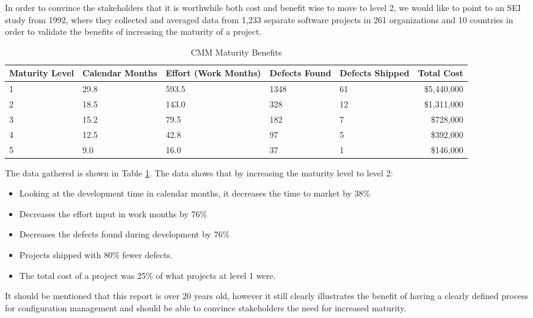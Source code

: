 \documentclass[10pt]{article}
\begin{document}
\noindent In order to convince the stakeholders that it is worthwhile both cost and benefit wise to move to level 2, we would like to point to an SEI study \cite{Merant} from 1992, where they collected and averaged data from 1,233 separate software projects in 261 organizations and 10 countries in order to validate the benefits of increasing the maturity of a project.
\\

\begin{table}[h!]
    \centering
        \begin{tabular}{| p{2cm} | p{2cm} | p{2cm} | l | l | r |}
         \hline
        Maturity Level & Calendar Months & Effort (Work Months) & Defects Found & Defects Shipped & Total Cost \\ \hline
        1 & 29.8 & 593.5 & 1348 & 61 & \$5,440,000 \\ \hline
        2 & 18.5 & 143.0 & 328 & 12 & \$1,311,000 \\ \hline
        3 & 15.2 & 79.5 & 182 & 7 & \$728,000 \\ \hline
        4 & 12.5 & 42.8 & 97 & 5 & \$392,000 \\ \hline
        5 & 9.0 & 16.0 & 37 & 1 & \$146,000 \\ \hline
    \end{tabular}
    \caption{CMM Maturity Benefits}
    \label{table:CMM}
\end{table}

\noindent The data gathered is shown in Table \ref{table:CMM}. The data shows that by increasing the maturity level to level 2:
\begin{itemize}
\item Looking at the development time in calendar months, it decreases the time to market by 38\%
\item Decreases the effort input in work months by 76\%
\item Decreases the defects found during development by 76\%
\item Projects shipped with 80\% fewer defects.
\item The total cost of a project was 25\% of what projects at level 1 were. \\
\end{itemize} 

\noindent It should be mentioned that this report is over 20 years old, however it still clearly illustrates the benefit of having a clearly defined process for configuration management and should be able to convince stakeholders the need for increased maturity.
\end{document}
